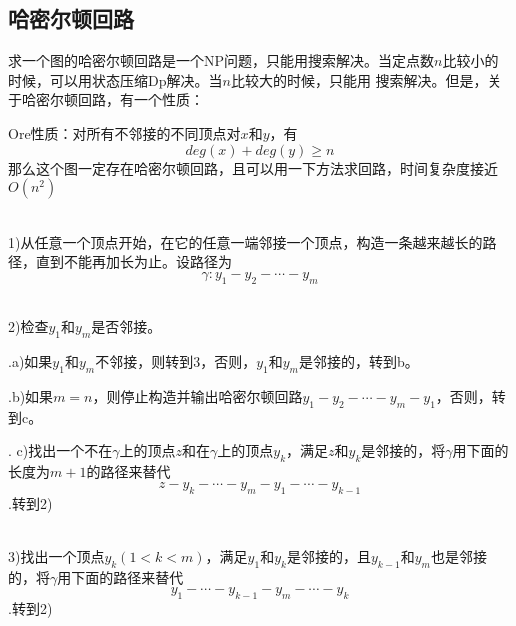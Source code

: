 \subsection{哈密尔顿回路}

求一个图的哈密尔顿回路是一个NP问题，只能用搜索解决。当定点数$n$比较小的时候，可以用状态压缩Dp解决。当$n$比较大的时候，只能用
搜索解决。但是，关于哈密尔顿回路，有一个性质：\par
Ore性质：对所有不邻接的不同顶点对$x$和$y$，有$$deg(x)+deg(y)\geq n$$
那么这个图一定存在哈密尔顿回路，且可以用一下方法求回路，时间复杂度接近$O(n^2)$ \par

~\\

1)从任意一个顶点开始，在它的任意一端邻接一个顶点，构造一条越来越长的路径，直到不能再加长为止。设路径为$$\gamma:y_1-y_2-\cdots-y_m$$

~\\

2)检查$y_1$和$y_m$是否邻接。\par
.\quad \quad a)如果$y_1$和$y_m$不邻接，则转到3，否则，$y_1$和$y_m$是邻接的，转到b。\par
.\quad \quad b)如果$m=n$，则停止构造并输出哈密尔顿回路$y_1-y_2-\cdots-y_m-y_1$，否则，转到c。\par
.\quad \quad
c)找出一个不在$\gamma$上的顶点$z$和在$\gamma$上的顶点$y_k$，满足$z$和$y_k$是邻接的，将$\gamma$用下面的长度为$m+1$的路径来替代
$$z-y_k-\cdots-y_m-y_1-\cdots-y_{k-1}$$
.\quad \quad 转到2)

~\\

3)找出一个顶点$y_k(1<k<m)$，满足$y_1$和$y_k$是邻接的，且$y_{k-1}$和$y_{m}$也是邻接的，将$\gamma$用下面的路径来替代
$$y_1-\cdots-y_{k-1}-y_{m}-\cdots-y_k$$
.\quad \quad 转到2)
